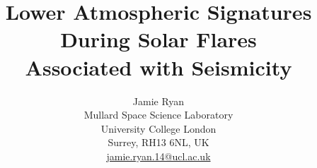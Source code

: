 \documentclass[11pt]{article}
\title{Lower Atmospheric Signatures During Solar Flares \\ Associated with Seismicity}
\author{Jamie Ryan \\
Mullard Space Science Laboratory \\
University College London \\
Surrey, RH13 6NL, UK\\
\href{mailto:jamie.ryan.14@ucl.ac.uk}{jamie.ryan.14@ucl.ac.uk}
\date{}}
\begin{document}
\maketitle
\tableofcontents

%
%
%
%
%
%
%

%


\label{Bibliography}
%
\end{document}
